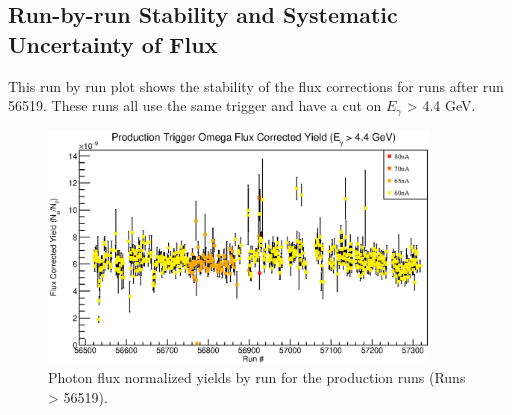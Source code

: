 \subsection{\label{sec:flux.runbyrun}Run-by-run Stability and Systematic Uncertainty of Flux}
This run by run plot shows the stability of the flux corrections for runs after run 56519. These runs all use the same trigger and have a cut on $E_{\gamma}$ > 4.4 GeV.

\begin{figure}[h]
\begin{center}
 \includegraphics[width=0.9\textwidth]{figures/gflux/gflux_runstability_omega.eps}
  \caption{Photon flux normalized yields by run for the production runs (Runs > 56519).}
  \label{gfluxbyrun}
  \end{center}
\end{figure}

\FloatBarrier
